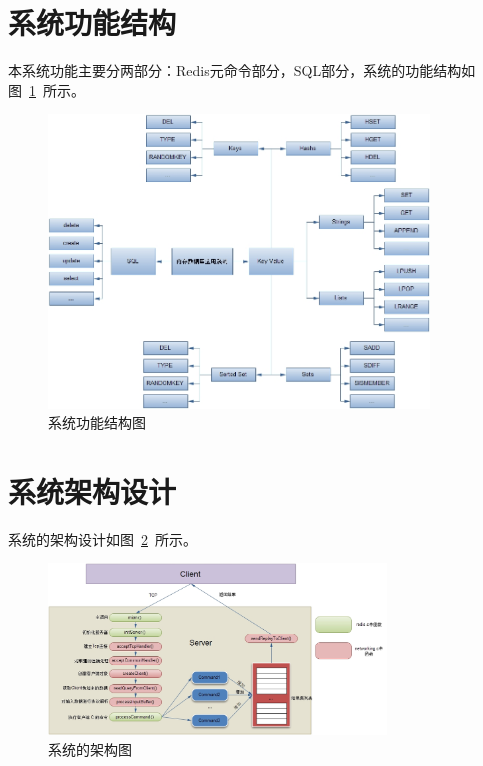 \documentclass{zjutthesis}
\begin{document}
\section{系统功能结构}
本系统功能主要分两部分：Redis元命令部分，SQL部分，系统的功能结构如图~\ref{fig:Command}~所示。
\begin{figure}[H]
\centering
\includegraphics[width=0.9\textwidth]{Command}
\caption{系统功能结构图}\label{fig:Command}
\vspace{\baselineskip} %
\end{figure}

\section{系统架构设计}

系统的架构设计如图~\ref{fig:System}~所示。
\begin{figure}[H]
\centering
\includegraphics[width=0.8\textwidth]{System}
\caption{系统的架构图}\label{fig:System}
\vspace{\baselineskip} %
\end{figure}
\end{document}
